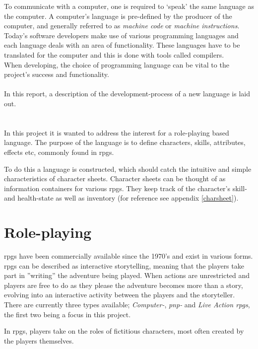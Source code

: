 
To communicate with a computer, one is required to `speak' the same language as the computer. A computer's language is pre-defined by the producer of the computer, and generally referred to as \emph{machine code} or \emph{machine instructions}.\\
Today's software developers make use of various programming languages and each language deals with an area of functionality. These languages have to be translated for the computer and this is done with tools called compilers.\\
When developing, the choice of programming language can be vital to the project's success and functionality.\\\\
In this report, a description of the development-process of a new language is laid out.

\section{\langname{}}
In this project it is wanted to address the interest for a role-playing based language. The purpose of the language is to define characters, skills, attributes, effects etc, commonly found in \ac{rpgs}.

To do this a language is constructed, which should catch the intuitive and simple characteristics of character sheets. Character sheets can be thought of as information containers for various \ac{rpgs}. They keep track of the character's skill- and health-state as well as inventory (for reference see appendix \vref{charsheet}).

\section{Role-playing}
\ac{rpgs} have been commercially available since the 1970's and exist in various forms. \ac{rpgs} can be described as interactive storytelling, meaning that the players take part in ''writing'' the adventure being played. When actions are unrestricted and players are free to do as they please the adventure becomes more than a story, evolving into an interactive activity between the players and the storyteller.
There are currently three types available; \emph{Computer-}, \emph{\ac{pnp}-} and \emph{Live Action \ac{rpgs}}, the first two being a focus in this project.

In \ac{rpgs}, players take on the roles of fictitious characters, most often created by the players themselves.

